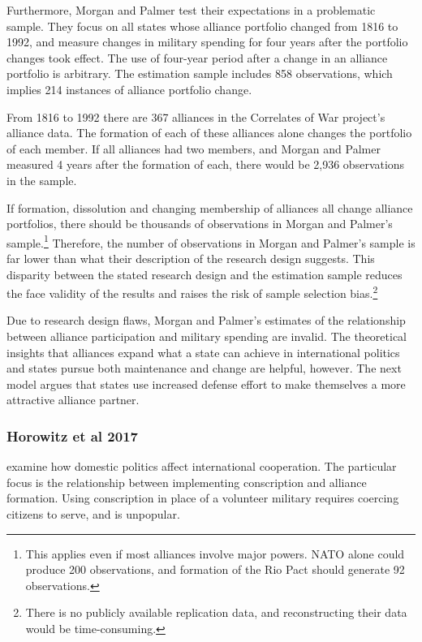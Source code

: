 \documentclass[12pt]{article}
\begin{document}
Furthermore, Morgan and Palmer test their expectations in a problematic sample.
They focus on all states whose alliance portfolio changed from 1816 to 1992, and measure changes in military spending for four years after the portfolio changes took effect.
The use of four-year period after a change in an alliance portfolio is arbitrary. 
The estimation sample includes 858 observations, which implies 214 instances of alliance portfolio change.  


From 1816 to 1992 there are 367 alliances in the Correlates of War project's alliance data.
The formation of each of these alliances alone changes the portfolio of each member. 
If all alliances had two members, and Morgan and Palmer measured 4 years after the formation of each, there would be 2,936 observations in the sample. 


If formation, dissolution and changing membership of alliances all change alliance portfolios, there should be thousands of observations in Morgan and Palmer's sample.\footnote{This applies even if most alliances involve major powers. NATO alone could produce 200 observations, and formation of the Rio Pact should generate 92 observations.} 
Therefore, the number of observations in Morgan and Palmer's sample is far lower than what their description of the research design suggests.
This disparity between the stated research design and the estimation sample reduces the face validity of the results and raises the risk of sample selection bias.\footnote{There is no publicly available replication data, and reconstructing their data would be time-consuming.} 


Due to research design flaws, Morgan and Palmer's estimates of the relationship between alliance participation and military spending are invalid. 
The theoretical insights that alliances expand what a state can achieve in international politics and states pursue both maintenance and change are helpful, however. 
The next model argues that states use increased defense effort to make themselves a more attractive alliance partner. 



\subsubsection{Horowitz et al 2017} 

\citet{Horowitzetal2017} examine how domestic politics affect international cooperation. 
The particular focus is the relationship between implementing conscription and alliance formation. 
Using conscription in place of a volunteer military requires coercing citizens to serve, and is unpopular. 
\end{document}
